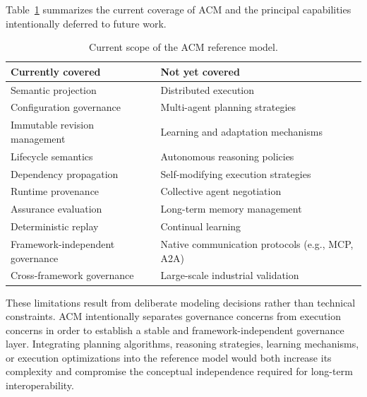 \documentclass[10pt]{article}
\begin{document}
Table~\ref{tab:limitations_scope} summarizes the current coverage of ACM and the principal capabilities intentionally deferred to future work.

\begin{table}[t]
	\caption{Current scope of the ACM reference model.}
	\label{tab:limitations_scope}
	\centering
	\begin{tabular}{ll}
		
		\toprule
		
		Currently covered &
		Not yet covered \\
		
		\midrule
		
		Semantic projection &
		Distributed execution \\
		
		Configuration governance &
		Multi-agent planning strategies \\
		
		Immutable revision management &
		Learning and adaptation mechanisms \\
		
		Lifecycle semantics &
		Autonomous reasoning policies \\
		
		Dependency propagation &
		Self-modifying execution strategies \\
		
		Runtime provenance &
		Collective agent negotiation \\
		
		Assurance evaluation &
		Long-term memory management \\
		
		Deterministic replay &
		Continual learning \\
		
		Framework-independent governance &
		Native communication protocols (e.g., MCP, A2A) \\
		
		Cross-framework governance &
		Large-scale industrial validation \\
		
		\bottomrule
		
	\end{tabular}
	
\end{table}

These limitations result from deliberate modeling decisions rather than technical constraints. ACM intentionally separates governance concerns from execution concerns in order to establish a stable and framework-independent governance layer. Integrating planning algorithms, reasoning strategies, learning mechanisms, or execution optimizations into the reference model would both increase its complexity and compromise the conceptual independence required for long-term interoperability.
\end{document}
